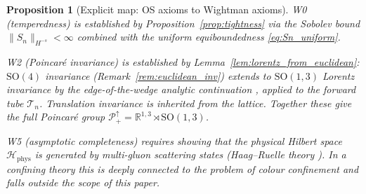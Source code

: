 \documentclass[11pt,a4paper]{amsart}
\newtheorem{proposition}[theorem]{Proposition}
\theoremstyle{definition}
\newcommand{\R}{\mathbb{R}}
\begin{document}
\begin{proposition}[Explicit map: OS axioms to Wightman axioms]
\emph{W0} (temperedness) is established by Proposition~\ref{prop:tightness}
via the Sobolev bound $\|S_n\|_{H^{-s}} < \infty$ combined with the uniform
equiboundedness \eqref{eq:Sn_uniform}.

\emph{W2} (Poincaré invariance) is established by Lemma~\ref{lem:lorentz_from_euclidean}:
$\mathrm{SO}(4)$ invariance (Remark~\ref{rem:euclidean_inv}) extends to
$\mathrm{SO}(1,3)$ Lorentz invariance by the edge-of-the-wedge analytic continuation
\cite[Thm.~2.14]{ReedSimon4}, applied to the forward tube $\mathcal{T}_n$.
Translation invariance is inherited from the lattice.  Together these give the
full Poincaré group $\mathcal{P}_+^\uparrow = \R^{1,3} \rtimes \mathrm{SO}(1,3)$.

\emph{W5} (asymptotic completeness) requires showing that the physical Hilbert
space $\mathcal{H}_{\mathrm{phys}}$ is generated by multi-gluon scattering states
(Haag--Ruelle theory \cite{Haag55,Ruelle62}).  In a confining theory this is
deeply connected to the problem of colour confinement and falls outside the
scope of this paper.
\end{proposition}
\end{document}
